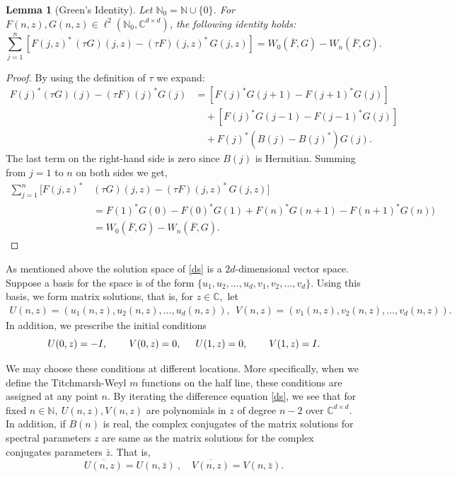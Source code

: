 \documentclass[reqno]{amsart}
\numberwithin{equation}{section}
\newcommand{\C}{\mathbb{C}}
\newcommand{\N}{\mathbb{N}}
\newtheorem{lemma}{Lemma}[section]
\begin{document}
\begin{lemma}[Green's Identity] Let $\mathbb{N}_0 = \mathbb{N} \cup \{0\}$. For $F(n, z), G(n, z) \in \ell^2(\mathbb{N}_0, \mathbb{C}^{d\times d} )$, the following identity holds:
\[
\sum_{j=1}^{n} \left[ F(j, z)^* \, (\tau G)(j, z) - (\tau F)(j, z)^* \, G(j, z) \right]
= W_0(\overline{F}, G) - W_n(\overline{F}, G).
\]
\end{lemma}
\begin{proof}   By using the definition of $\tau$ we expand:
\begin{align*}
F(j)^* (\tau G)(j) - (\tau F)(j)^* G(j) 
&= \left[ F(j)^* G(j+1) - F(j+1)^* G(j) \right] \\
&\quad + \left[ F(j)^* G(j-1) - F(j-1)^* G(j) \right] \\
&\quad + F(j)^* (B(j) - B(j)^*) G(j).
\end{align*} 
The last term  on the right-hand side is  zero since $B(j)$ is Hermitian. Summing from $j=1$ to $n$ on both sides we get,
\begin{align*}
\sum_{j=1}^{n}  [ F(j, z)^* \, & (\tau G)(j, z) -  (\tau F)(j, z)^* \, G(j, z)  ] \\ & = F(1)^*G(0) -F(0)^*G(1) +F(n)^*G(n+1) -F(n+1)^*G(n) )
 \\ & = W_0(\overline{F}, G) - W_n(\overline{F}, G).
\end{align*}
\end{proof}
As mentioned above the solution space of \eqref{ds} is a $2d$-dimensional vector space. Suppose a basis for the space  is of the form  $ \{ u_1,  u_2,  \dots, u_d, v_1, v_2, \dots, v_d \} $. Using this basis, we form matrix solutions, that is, for $z\in \C,$ let 
\begin{align}\label{is} 
U(n,z) = (u_1(n,z), u_2(n,z), \hdots, u_d(n,z)), \ \  V(n,z) = (v_1(n,z), v_2(n,z), \hdots, v_d(n,z)) .
\end{align} 
In addition, we prescribe the initial conditions
\begin{equation}
\label{ic} U(0,z)= -I, \hspace{.3in} V(0,z)= 0, \hspace{.2in}U(1,z) =0, \hspace{.3in} V(1,z)= I .
\end{equation}

We may choose these conditions at different locations. More specifically, when we define the Titchmarsh-Weyl $m$ functions on the half line, these conditions are assigned at any point $n.$ By iterating the difference equation \eqref{ds}, we see that for fixed $n\in \N,\  U(n,z),  V(n,z)$ are polynomials in $z$ of degree $n-2$ over $ \C^{d\times d}.$ In addition, if $ B(n)$ is real, the complex conjugates of the matrix solutions for   spectral parameters $z$ are same as the matrix solutions for the complex conjugates parameters $\bar{z}.$ That is, 
$$
\overline{U(n,z)} = U(n,\bar{z})\ , \quad \overline{V(n,z)}=V(n,\bar{z}).$$
\end{document}
